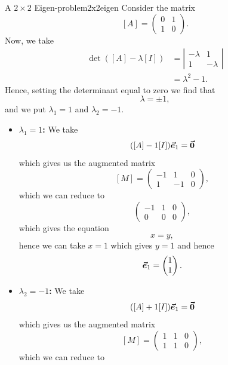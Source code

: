         \begin{ex}{A $2\times 2$ Eigen-problem}{2x2eigen}
         Consider the matrix
         \[
         [A]=\begin{pmatrix} 0 & 1 \\ 1 & 0 \end{pmatrix}.
         \]
         Now, we take
         \begin{align*}
             \det([A]-\lambda [I])&= \left| \begin{matrix} -\lambda & 1 \\ 1 & -\lambda \end{matrix} \right|\\
             &= \lambda^2-1.
         \end{align*}
         Hence, setting the determinant equal to zero we find that
         \[
         \lambda = \pm 1,
         \]
         and we put $\lambda_1=1$ and $\lambda_2=-1$.
         \begin{itemize}
             \item \textbf{$\lambda_1=1$:} We take
             \[
             ([A]-1[I])\boldsymbol{\vec{e}}_1 = \boldsymbol{\vec{0}}
             \]
             which gives us the augmented matrix
             \[
             [M] =\left( \begin{array}{cc|c} -1 & 1 & 0\\ 1 & -1 &0 \end{array}\right),
             \]
             which we can reduce to
             \[
             \left( \begin{array}{cc|c} -1 & 1 & 0\\ 0 & 0 & 0 \end{array}\right),
             \]
             which gives the equation 
             \[
             x=y,
             \]
             hence we can take $x=1$ which gives $y=1$ and hence
             \[
             \boldsymbol{\vec{e}}_1 = \begin{pmatrix} 1 \\ 1 \end{pmatrix}.
             \]
             \item \textbf{$\lambda_2=-1$:} We take
             \[
             ([A]+1[I])\boldsymbol{\vec{e}}_1 = \boldsymbol{\vec{0}}
             \]
             which gives us the augmented matrix
             \[
             [M] =\left( \begin{array}{cc|c} 1 & 1 & 0\\ 1 & 1 &0 \end{array}\right),
             \]
             which we can reduce to
             \[
\]
\end{itemize}
\end{ex}

